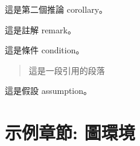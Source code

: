 \documentclass[
    writingLanguage=chinese, %
    addPageTitle=on,  %
    addDeclaration=on, %
    addMUSTlogo=on, %
    addFigTOC=on, %
    addTabTOC=on, %
    refIndent=off, %
    printMod=off, %
]{.def/must}
\begin{document}
\begin{corollary}
這是第二個推論 corollary。
\end{corollary}

\begin{remark}
這是註解 remark。
\end{remark}



\begin{condition}
這是條件 condition。
\end{condition}

 \begin{quote}
     這是一段引用的段落
 \end{quote}

\begin{assumption}
這是假設 assumption。
\end{assumption}





\chapter{示例章節: 圖環境}
\end{document}
